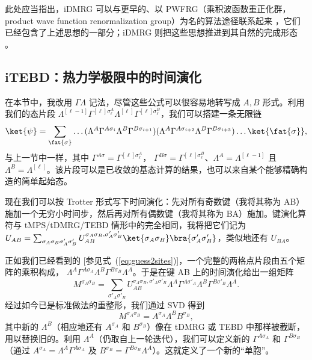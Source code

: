 此处应当指出，iDMRG 可以与更早的、以 PWFRG（乘积波函数重正化群，product wave function renormalization group）为名的算法途径联系起来 \cite{NishinoOkunishi95,Hieida97,Ueda06}，它们已经包含了上述思想的一部分；iDMRG 则把这些思想推进到其自然的完成形态 \cite{Ueda08,Ueda10}。

\subsection{iTEBD：热力学极限中的时间演化}
在本节中，我改用 $\Gamma\Lambda$ 记法，尽管这些公式可以很容易地转写成 $A,B$ 形式。利用我们的态片段 $\Lambda^{[\ell-1]} \Gamma^{[\ell]\sigma_\ell^A} \Lambda^{[\ell]} \Gamma^{[\ell]\sigma_\ell^B}$，我们可以搭建一条无限链
\begin{equation}
\ket{\psi} = \sum_{\fat{\sigma}} \ldots (\Lambda^A \Gamma^{A \sigma_i} \Lambda^B \Gamma^{B \sigma_{i+1}})(\Lambda^A \Gamma^{A \sigma_{i+2}} \Lambda^B \Gamma^{B \sigma_{i+3}}) \ldots \ket{\fat{\sigma}} ,
\end{equation}
与上一节中一样，其中 $\Gamma^{A\sigma}= \Gamma^{[\ell]\sigma_\ell^A}$，
$\Gamma^{B\sigma}= \Gamma^{[\ell]\sigma_\ell^B}$、$\Lambda^A=\Lambda^{[\ell-1]}$ 且
$\Lambda^B=\Lambda^{[\ell]}$。该片段可以是已收敛的基态计算的结果，也可以来自某个能够精确构造的简单起始态。

现在我们可以按 Trotter 形式写下时间演化：先对所有奇数键（我将其称为 AB）施加一个无穷小时间步，然后再对所有偶数键（我将其称为 BA）施加。键演化算符与 tMPS/tDMRG/TEBD 情形中的完全相同，我将把它们记为 $U_{AB} = \sum_{\sigma_A\sigma_B\sigma'_A\sigma'_B} U_{AB}^ {\sigma_A\sigma_B, \sigma'_A\sigma'_B} \ket{\sigma_A\sigma_B} \bra{\sigma'_A\sigma'_B}$，类似地还有 $U_{BA}$。

正如我们已经看到的 [参见式~(\ref{eq:guess2sites})]，一个完整的两格点片段由五个矩阵的乘积构成，
$\Lambda^A \Gamma^{A \sigma_A} \Lambda^B \Gamma^{B \sigma_{B}} \Lambda^A$。于是在键 AB 上的时间演化给出一组矩阵
\begin{equation}
M^{\sigma_A\sigma_{B}} = \sum_{\sigma'_A\sigma'_{B}} U_{AB}^ {\sigma_A\sigma_{B}, \sigma'_A\sigma'_{B}}  \Lambda^A \Gamma^{A \sigma'_A} \Lambda^B \Gamma^{B \sigma'_{B}} \Lambda^A .
\end{equation}
经过如今已是标准做法的重整形，我们通过 SVD 得到
\begin{equation}
M^{\sigma_A\sigma_{B}}=A^{\sigma_A} \Lambda^B B^{\sigma_{B}} ,
\end{equation}
其中新的 $\Lambda^B$（相应地还有 $A^{\sigma_A}$ 和 $B^{\sigma_{B}}$）像在 tDMRG 或 TEBD 中那样被截断，用以替换旧的。利用 $\Lambda^A$（仍取自上一轮迭代），我们可以定义新的 $\Gamma^{A \sigma_A}$ 和 $\Gamma^{B \sigma_{B}} $（通过 $A^{\sigma_A} = \Lambda^A \Gamma^{A \sigma_A}$ 及
$B^{\sigma_{B}} = \Gamma^{B \sigma_{B}} \Lambda^A$）。这就定义了一个新的“单胞”。

